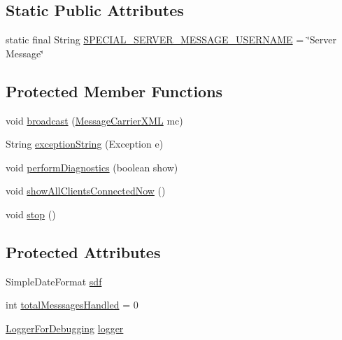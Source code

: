 \subsection*{Static Public Attributes}
\begin{DoxyCompactItemize}
\item 
static final String \hyperlink{classgov_1_1fnal_1_1ppd_1_1dd_1_1chat_1_1MessagingServer_a738da0a18944421491268d2220a3c7a4}{S\-P\-E\-C\-I\-A\-L\-\_\-\-S\-E\-R\-V\-E\-R\-\_\-\-M\-E\-S\-S\-A\-G\-E\-\_\-\-U\-S\-E\-R\-N\-A\-M\-E} = \char`\"{}Server Message\char`\"{}
\end{DoxyCompactItemize}
\subsection*{Protected Member Functions}
\begin{DoxyCompactItemize}
\item 
void \hyperlink{classgov_1_1fnal_1_1ppd_1_1dd_1_1chat_1_1MessagingServer_ad4cb5effceeb2b11031e3cf2ec0e5939}{broadcast} (\hyperlink{classgov_1_1fnal_1_1ppd_1_1dd_1_1xml_1_1MessageCarrierXML}{Message\-Carrier\-X\-M\-L} mc)
\item 
String \hyperlink{classgov_1_1fnal_1_1ppd_1_1dd_1_1chat_1_1MessagingServer_afe655a915ee116333ee6f1c8331b7929}{exception\-String} (Exception e)
\item 
void \hyperlink{classgov_1_1fnal_1_1ppd_1_1dd_1_1chat_1_1MessagingServer_af24f72f6ce9d270c33afb4032d9c968b}{perform\-Diagnostics} (boolean show)
\item 
void \hyperlink{classgov_1_1fnal_1_1ppd_1_1dd_1_1chat_1_1MessagingServer_a90da887bb782b08af3fb1dbce8c3e502}{show\-All\-Clients\-Connected\-Now} ()
\item 
void \hyperlink{classgov_1_1fnal_1_1ppd_1_1dd_1_1chat_1_1MessagingServer_a2ab9736895b528ec810dd27eb5761295}{stop} ()
\end{DoxyCompactItemize}
\subsection*{Protected Attributes}
\begin{DoxyCompactItemize}
\item 
Simple\-Date\-Format \hyperlink{classgov_1_1fnal_1_1ppd_1_1dd_1_1chat_1_1MessagingServer_ac727c375b30722fb0d0a88f27eb97954}{sdf}
\item 
int \hyperlink{classgov_1_1fnal_1_1ppd_1_1dd_1_1chat_1_1MessagingServer_a6847562b2441991b550f7b3cb7fe8f2d}{total\-Messsages\-Handled} = 0
\item 
\hyperlink{classgov_1_1fnal_1_1ppd_1_1dd_1_1chat_1_1LoggerForDebugging}{Logger\-For\-Debugging} \hyperlink{classgov_1_1fnal_1_1ppd_1_1dd_1_1chat_1_1MessagingServer_acc91232824dd5e89347e0d8ac29abae8}{logger}
\end{DoxyCompactItemize}

